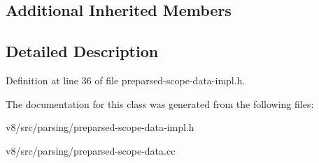 \subsection*{Additional Inherited Members}


\subsection{Detailed Description}


Definition at line 36 of file preparsed-\/scope-\/data-\/impl.\+h.



The documentation for this class was generated from the following files\+:\begin{DoxyCompactItemize}
\item 
v8/src/parsing/preparsed-\/scope-\/data-\/impl.\+h\item 
v8/src/parsing/preparsed-\/scope-\/data.\+cc\end{DoxyCompactItemize}
